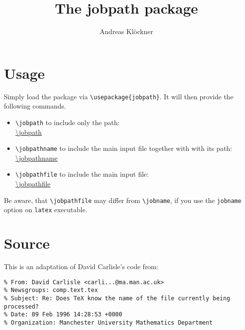 \documentclass{article}
\title{The jobpath package}
\author{Andreas Kl\"ockner}
\begin{document}
  \maketitle

\section{Usage}
Simply load the package via \lstinline!\usepackage{jobpath}!. It will then provide the following commands.

\begin{itemize}
	\item \lstinline!\jobpath! to include only the path:\\
	      \expandafter\url\expandafter{\jobpath}
	\item \lstinline!\jobpathname! to include the main input file together with with its path:\\
	      \expandafter\url\expandafter{\jobpathname}
	\item \lstinline!\jobpathfile! to include the main input file:\\
	      \expandafter\url\expandafter{\jobpathfile}
\end{itemize}

Be aware, that \lstinline!\jobpathfile! may differ from \lstinline!\jobname!, if you use the \lstinline!jobname! option on \lstinline!latex! executable.

\section{Source}
This is an adaptation of David Carlisle's code from:
\begin{verbatim}
% From: David Carlisle <carli...@ma.man.ac.uk>
% Newsgroups: comp.text.tex
% Subject: Re: Does TeX know the name of the file currently being processed?
% Date: 09 Feb 1996 14:28:53 +0000
% Organization: Manchester University Mathematics Department
\end{verbatim}
\end{document}
